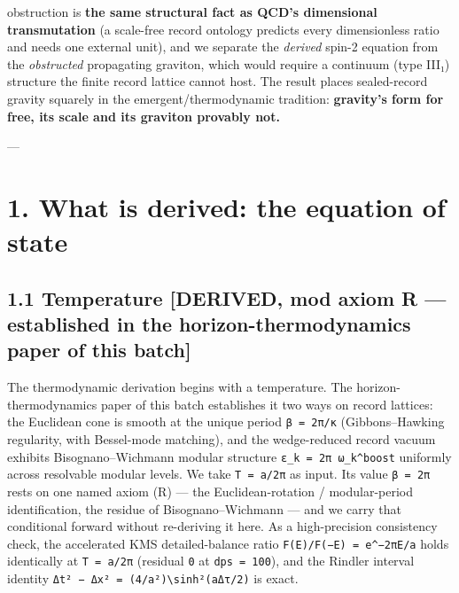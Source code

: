 \documentclass[11pt]{article}
\begin{document}
obstruction is \textbf{the same structural fact as QCD's dimensional transmutation} (a scale-free record ontology predicts every dimensionless ratio and needs one external unit), and we separate the \emph{derived} spin-2 equation from the \emph{obstructed} propagating graviton, which would require a continuum (type III₁) structure the finite record lattice cannot host. The result places sealed-record gravity squarely in the emergent/thermodynamic tradition: \textbf{gravity's form for free, its scale and its graviton provably not.}

---

\section*{1. What is derived: the equation of state}
\subsection*{1.1 Temperature [DERIVED, mod axiom R — established in the horizon-thermodynamics paper of this batch]}
The thermodynamic derivation begins with a temperature. The horizon-thermodynamics paper of this batch establishes it two ways on record lattices: the Euclidean cone is smooth at the unique period \texttt{β = 2π/κ} (Gibbons–Hawking regularity, with Bessel-mode matching), and the wedge-reduced record vacuum exhibits Bisognano–Wichmann modular structure \texttt{ε\_k = 2π ω\_k\textasciicircum{}{boost}} uniformly across resolvable modular levels. We take \texttt{T = a/2π} as input. Its value \texttt{β = 2π} rests on one named axiom (R) — the Euclidean-rotation / modular-period identification, the residue of Bisognano–Wichmann — and we carry that conditional forward without re-deriving it here. As a high-precision consistency check, the accelerated KMS detailed-balance ratio \texttt{F(E)/F(−E) = e\textasciicircum{}{−2πE/a}} holds identically at \texttt{T = a/2π} (residual \texttt{0} at \texttt{dps = 100}), and the Rindler interval identity \texttt{Δt² − Δx² = (4/a²)\textbackslash{}sinh²(aΔτ/2)} is exact.
\end{document}
